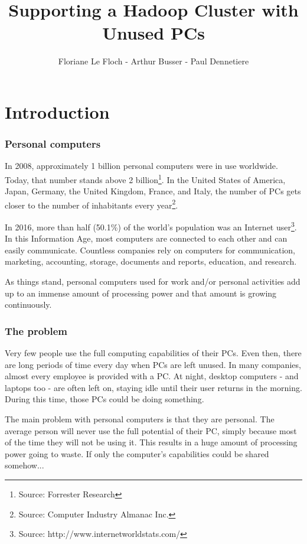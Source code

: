 \documentclass[11pt]{report} %
\title{Supporting a Hadoop Cluster with Unused PCs}
\author{Floriane Le Floch - Arthur Busser - Paul Dennetiere}
\begin{document}
\maketitle
\renewcommand{\contentsname}{Summary}
\newpage
\tableofcontents
\newpage

\part{Introduction}

\section{Personal computers}
In 2008, approximately 1 billion personal computers were in use worldwide. Today, that number stands above 2 billion\footnote{Source: Forrester Research}. In the United States of America, Japan, Germany, the United Kingdom, France, and Italy, the number of PCs gets closer to the number of inhabitants every year\footnote{Source: Computer Industry Almanac Inc.}.

In 2016, more than half (50.1\%) of the world's population was an Internet user\footnote{Source: http://www.internetworldstats.com/}. In this Information Age, most computers are connected to each other and can easily communicate. Countless companies rely on computers for communication, marketing, accounting, storage, documents and reports, education, and research.

As things stand, personal computers used for work and/or personal activities add up to an immense amount of processing power and that amount is growing continuously.

\section{The problem}
Very few people use the full computing capabilities of their PCs. Even then, there are long periods of time every day when PCs are left unused. In many companies, almost every employee is provided with a PC. At night, desktop computers - and laptops too - are often left on, staying idle until their user returns in the morning. During this time, those PCs could be doing something.

The main problem with personal computers is that they are personal. The average person will never use the full potential of their PC, simply because most of the time they will not be using it. This results in a huge amount of processing power going to waste. If only the computer's capabilities could be shared somehow...
  
\end{document}
